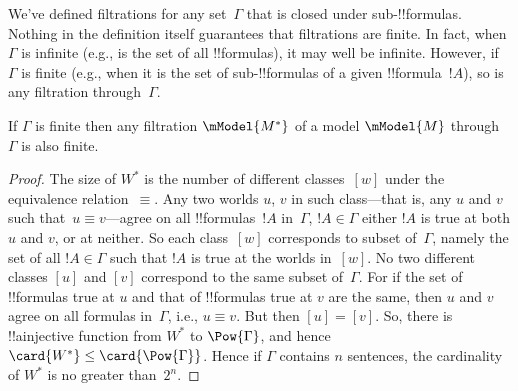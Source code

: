 \documentclass[../../../include/open-logic-section]{subfiles}
\begin{document}


We've defined filtrations for any set~$\Gamma$ that is closed under
sub-!!{formula}s. Nothing in the definition itself guarantees that
filtrations are finite. In fact, when $\Gamma$ is infinite (e.g., is
the set of all !!{formula}s), it may well be infinite. However, if
$\Gamma$ is finite (e.g., when it is the set of sub-!!{formula}s of a
given !!{formula}~$!A$), so is any filtration through~$\Gamma$.

\begin{prop}
  If $\Gamma$ is finite then any filtration $\mModel{M^*}$ of a model
  $\mModel{M}$ through $\Gamma$ is also finite.
\end{prop}

\begin{proof}
  The size of $W^*$ is the number of different classes~$[w]$ under the
  equivalence relation~$\equiv$. Any two worlds $u$, $v$ in such
  class---that is, any $u$ and $v$ such that~$u \equiv v$---agree on
  all !!{formula}s~$!A$ in~$\Gamma$, $!A \in \Gamma$ either $!A$ is
  true at both $u$ and $v$, or at neither. So each class~$[w]$
  corresponds to subset of~$\Gamma$, namely the set of all $!A \in
  \Gamma$ such that $!A$ is true at the worlds in~$[w]$. No two
  different classes $[u]$ and $[v]$ correspond to the same subset
  of~$\Gamma$. For if the set of !!{formula}s true at $u$ and that of
  !!{formula}s true at $v$ are the same, then $u$ and $v$ agree on all
  formulas in~$\Gamma$, i.e., $u \equiv v$. But then $[u] = [v]$.  So,
  there is !!a{injective} function from $W^*$ to $\Pow{\Gamma}$, and
  hence $\card{W^*} \le \card{\Pow{\Gamma}}$.  Hence if $\Gamma$
  contains $n$ sentences, the cardinality of $W^*$ is no greater
  than~$2^n$.
\end{proof}
\end{document}
